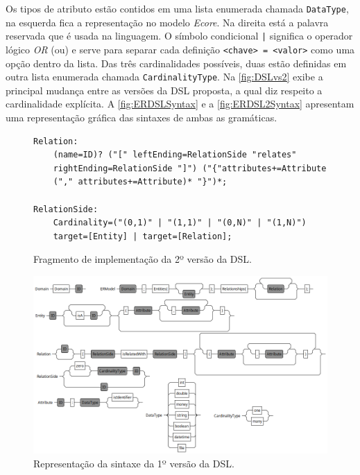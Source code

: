 Os tipos de atributo estão contidos em uma lista enumerada chamada \texttt{DataType}, na esquerda fica a representação no modelo \textit{Ecore}. 
Na direita está a palavra reservada que é usada na linguagem. 
O símbolo condicional \texttt{|} significa o operador lógico \textit{OR} (ou) e serve para separar cada definição \texttt{<chave> = <valor>} como uma opção dentro da lista. 
Das três cardinalidades possíveis, duas estão definidas em outra lista enumerada chamada \texttt{CardinalityType}. 
Na \autoref{fig:DSLvs2} exibe a principal mudança entre as versões da \ac{DSL} proposta, a qual diz respeito a cardinalidade explícita. 
A \autoref{fig:ERDSLSyntax} e a \autoref{fig:ERDSL2Syntax} apresentam uma representação gráfica das sintaxes de ambas as gramáticas.

\begin{figure}[!htb]
    \centering
    \caption{Fragmento de implementação da 2º versão da DSL.}
    \label{fig:DSLvs2}
    \begin{footnotesize}
\begin{lstlisting}[language = Xtext , frame = trbl]
Relation:
	(name=ID)? ("[" leftEnding=RelationSide "relates" 
	rightEnding=RelationSide "]") ("{"attributes+=Attribute 
	("," attributes+=Attribute)* "}")*;

RelationSide:
	Cardinality=("(0,1)" | "(1,1)" | "(0,N)" | "(1,N)")
	target=[Entity] | target=[Relation];
    \end{lstlisting}
    \end{footnotesize} 
\end{figure}

\begin{figure}[!htb]
    \centering
    \caption{Representação da sintaxe da 1º versão da DSL.}
    \label{fig:ERDSLSyntax}
    \includegraphics[width=\textwidth]{img/ERDSLSyntaxGraph.png}
\end{figure}

